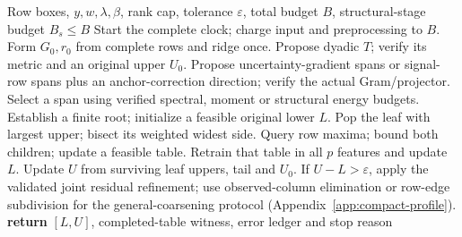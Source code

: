 \begin{algorithm}[t]
\caption{Original-table regret certification}\label{alg:certificate}
\begin{algorithmic}[1]
\REQUIRE Row boxes, $y,w,\lambda,\beta$, rank cap, tolerance $\varepsilon$, total budget $B$, structural-stage budget $B_s\le B$
\STATE Start the complete clock; charge input and preprocessing to $B$.
\STATE Form $G_0,r_0$ from complete rows and ridge once.
\STATE Propose dyadic $T$; verify its metric and an original upper $U_0$.
\STATE Propose uncertainty-gradient spans or signal-row spans plus an anchor-correction direction; verify the actual Gram/projector.
\STATE Select a span using verified spectral, moment or structural energy budgets.
\STATE Establish a finite root; initialize a feasible original lower $L$.
\STATE Pop the leaf with largest upper; bisect its weighted widest side.
\STATE Query row maxima; bound both children; update a feasible table.
\STATE Retrain that table in all $p$ features and update $L$.
\STATE Update $U$ from surviving leaf uppers, tail and $U_0$.
\ENDWHILE
\STATE If $U-L>\varepsilon$, apply the validated joint residual refinement; use observed-column elimination or row-edge subdivision for the general-coarsening protocol (Appendix~\ref{app:compact-profile}).
\STATE \textbf{return} $[L,U]$, completed-table witness, error ledger and stop reason
\end{algorithmic}
\end{algorithm}

